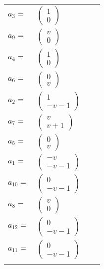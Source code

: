 \documentclass[1p]{elsarticle_modified}
\theoremstyle{definition}
\begin{document}
\begin{tabular}{m{7pt} m{180pt} m{7pt} m{180pt} }
\flushright $a_{3}=$&$\begin{pmatrix}1\\0\end{pmatrix}$ \\
\flushright $a_{9}=$&$\begin{pmatrix}v\\0\end{pmatrix}$ \\
\flushright $a_{4}=$&$\begin{pmatrix}1\\0\end{pmatrix}$ \\
\flushright $a_{6}=$&$\begin{pmatrix}0\\v\end{pmatrix}$ \\
\flushright $a_{2}=$&$\begin{pmatrix}1\\- v-1\end{pmatrix}$ \\
\flushright $a_{7}=$&$\begin{pmatrix}v\\v+1\end{pmatrix}$ \\
\flushright $a_{5}=$&$\begin{pmatrix}0\\v\end{pmatrix}$ \\
\flushright $a_{1}=$&$\begin{pmatrix}- v\\- v-1\end{pmatrix}$ \\
\flushright $a_{10}=$&$\begin{pmatrix}0\\- v-1\end{pmatrix}$ \\
\flushright $a_{8}=$&$\begin{pmatrix}v\\0\end{pmatrix}$ \\
\flushright $a_{12}=$&$\begin{pmatrix}0\\- v-1\end{pmatrix}$ \\
\flushright $a_{11}=$&$\begin{pmatrix}0\\- v-1\end{pmatrix}$\\&\end{tabular}
\end{document}
